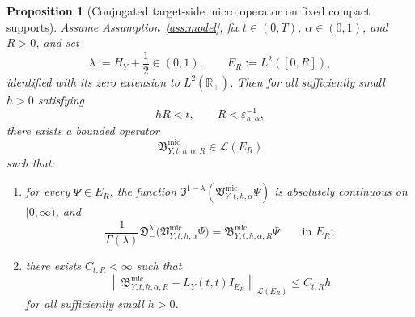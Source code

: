 \documentclass[11pt,a4paper]{amsart}
\theoremstyle{plain}
\newtheorem{proposition}[theorem]{Proposition}
\theoremstyle{definition}
\theoremstyle{remark}
\newcommand{\R}{\mathbb{R}}
\begin{document}
\begin{proposition}[Conjugated target-side micro operator on fixed compact supports]
\label{prop:BY-micro}
Assume Assumption~\ref{ass:model}, fix \(t\in(0,T)\), \(\alpha\in(0,1)\), and \(R>0\), and set
\[
\lambda:=H_Y+\frac12\in(0,1),
\qquad
E_R:=L^2([0,R]),
\]
identified with its zero extension to \(L^2(\R_+)\). Then for all sufficiently small \(h>0\)
satisfying
\[
hR<t,
\qquad
R<\varepsilon_{h,\alpha}^{-1},
\]
there exists a bounded operator
\[
\mathfrak B_{Y,t,h,\alpha,R}^{\mathrm{mic}}\in \mathcal L(E_R)
\]
such that:
\begin{enumerate}[label=(\roman*)]
\item for every \(\Psi\in E_R\), the function
\(\mathfrak I_-^{1-\lambda}(\mathfrak V_{Y,t,h,\alpha}^{\mathrm{mic}}\Psi)\) is absolutely
continuous on \([0,\infty)\), and
\begin{equation}\label{eq:BY-micro-conj}
\frac{1}{\Gamma(\lambda)}
\mathfrak D_-^\lambda
\bigl(
\mathfrak V_{Y,t,h,\alpha}^{\mathrm{mic}}\Psi
\bigr)
=
\mathfrak B_{Y,t,h,\alpha,R}^{\mathrm{mic}}\Psi
\qquad\text{in }E_R;
\end{equation}
\item there exists \(C_{t,R}<\infty\) such that
\begin{equation}\label{eq:BY-micro-close}
\left\|
\mathfrak B_{Y,t,h,\alpha,R}^{\mathrm{mic}}-L_Y(t,t)I_{E_R}
\right\|_{\mathcal L(E_R)}
\le
C_{t,R}h
\end{equation}
for all sufficiently small \(h>0\).
\end{enumerate}
\end{proposition}
\end{document}
